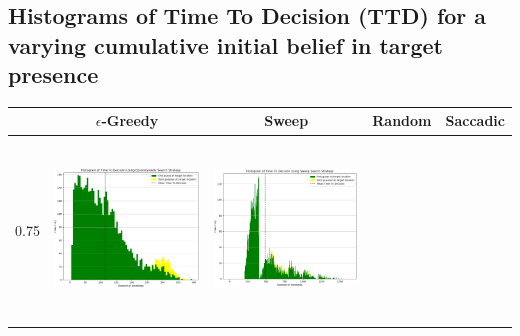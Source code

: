\begin{landscape}
\section{Histograms of Time To Decision (TTD) for a varying cumulative initial belief in target presence}

\begin{table}[h!]
  \centering
  \begin{tabular}{ | c | c | c | c | c |}
    \hline
    & $\epsilon$-Greedy & Sweep & Random & Saccadic \\
    \hline
    0.75 & 
    \begin{minipage}[c][48mm][c]{48mm}
      \includegraphics[width=48mm, height=48mm]{Chapters/MultiAgentTargetDetection/Figs/Histograms/VaryingInitBelief/75/75EpsilonGreedyHistogram.png}
    \end{minipage}
    &
    \begin{minipage}[c][48mm][c]{48mm}
      \includegraphics[width=48mm, height=48mm]{Chapters/MultiAgentTargetDetection/Figs/Histograms/VaryingInitBelief/75/75SweepHistogram.png}


\end{minipage}
\end{tabular}
\end{table}
\end{landscape}
